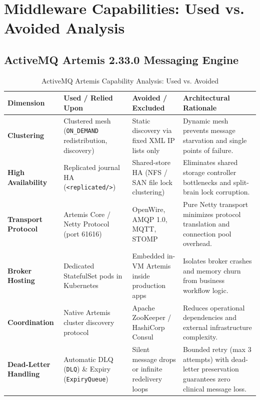 \newpage
\section{Middleware Capabilities: Used vs. Avoided Analysis}

\subsection{ActiveMQ Artemis 2.33.0 Messaging Engine}

\begin{table}[htbp]
\centering
\scriptsize
\begin{tabularx}{\textwidth}{P{3.0cm} P{3.8cm} P{3.8cm} Y}
\toprule
\textbf{Dimension} & \textbf{Used / Relied Upon} & \textbf{Avoided / Excluded} & \textbf{Architectural Rationale} \\
\midrule
\textbf{Clustering} & Clustered mesh (\nolinkurl{ON_DEMAND} redistribution, discovery) & Static discovery via fixed XML IP lists only & Dynamic mesh prevents message starvation and single points of failure. \\
\addlinespace
\textbf{High Availability} & Replicated journal HA (\nolinkurl{<replicated/>}) & Shared-store HA (NFS / SAN file lock clustering) & Eliminates shared storage controller bottlenecks and split-brain lock corruption. \\
\addlinespace
\textbf{Transport Protocol} & Artemis Core / Netty Protocol (port 61616) & OpenWire, AMQP 1.0, MQTT, STOMP & Pure Netty transport minimizes protocol translation and connection pool overhead. \\
\addlinespace
\textbf{Broker Hosting} & Dedicated StatefulSet pods in Kubernetes & Embedded in-VM Artemis inside production apps & Isolates broker crashes and memory churn from business workflow logic. \\
\addlinespace
\textbf{Coordination} & Native Artemis cluster discovery protocol & Apache ZooKeeper / HashiCorp Consul & Reduces operational dependencies and external infrastructure complexity. \\
\addlinespace
\textbf{Dead-Letter Handling} & Automatic DLQ (\nolinkurl{DLQ}) \& Expiry (\nolinkurl{ExpiryQueue}) & Silent message drops or infinite redelivery loops & Bounded retry (max 3 attempts) with dead-letter preservation guarantees zero clinical message loss. \\
\bottomrule
\end{tabularx}
\caption{ActiveMQ Artemis Capability Analysis: Used vs. Avoided}
\label{tab:artemis_used_vs_avoided}
\end{table}

